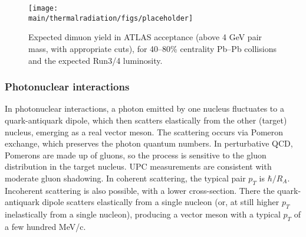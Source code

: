 \documentclass[../report.tex]{subfiles}
\providecommand{\main}{..}
\begin{document}
\begin{figure}[htb]
\centering
\texttt{[image: \\main/thermalradiation/figs/placeholder]}
\caption{Expected dimuon yield in ATLAS acceptance (above 4 GeV pair mass, with appropriate cuts), for 40--80\% centrality Pb--Pb collisions and the expected Run3/4 luminosity.}
\label{fig:ATLASprojection_dimuonYield} 
\end{figure}


\subsubsection{Photonuclear interactions}

In photonuclear interactions, a photon emitted by one nucleus fluctuates to a quark-antiquark dipole, which then scatters elastically from the other (target) nucleus, emerging as a real vector meson.  The scattering occurs via Pomeron exchange, which preserves the photon quantum numbers.  In perturbative QCD, Pomerons are made up of gluons, so the process is sensitive to the gluon distribution in the target nucleus.  UPC measurements are consistent with moderate gluon shadowing.   In coherent scattering, the typical pair $p_T$ is $\hbar/R_A$.  Incoherent scattering is also possible, with a lower cross-section.  There the quark-antiquark dipole scatters elastically from a single nucleon (or, at still higher $p_T$ inelastically from a single nucleon), producing a vector meson with a typical $p_T$ of a few hundred MeV/c.
\end{document}

